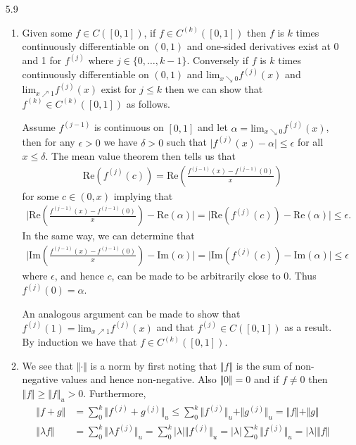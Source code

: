 \documentclass[11pt,letter]{article}
\begin{document}
\begin{enumerate}
    \item [5.9] \begin{enumerate} \item Given some $f \in C([0,1])$, if $f \in C^{(k)}([0,1])$ then $f$ is $k$ times continuously differentiable on $(0,1)$ and one-sided derivatives exist at 0 and 1 for $f^{(j)}$ where $j \in \{0,\dots,k-1\}$. Conversely if $f$ is $k$ times continuously differentiable on $(0,1)$ and $\text{lim}_{x \searrow 0} f^{(j)}(x)$ and $\text{lim}_{x \nearrow 1} f^{(j)}(x)$ exist for $j \le k$ then we can show that $f^{(k)} \in C^{(k)}([0,1])$ as follows.
    
    Assume $f^{(j-1)}$ is continuous on $[0,1]$ and let $\alpha = \text{lim}_{x \searrow 0} f^{(j)}(x)$, then for any $\epsilon > 0$ we have $\delta > 0$ such that $\vert f^{(j)}(x) - \alpha \vert \le \epsilon$ for all $x \le \delta$. The mean value theorem then tells us that
    \begin{align*}
        \text{Re}(f^{(j)}(c)) = \text{Re}(\frac{f^{(j-1)}(x) - f^{(j-1)}(0)}{x})
    \end{align*}
    for some $c \in (0,x)$ implying that
    \begin{align*}
        \vert \text{Re}(\frac{f^{(j-1)}(x) - f^{(j-1)}(0)}{x}) - \text{Re}(\alpha) \vert = \vert \text{Re}(f^{(j)}(c)) - \text{Re}(\alpha) \vert \le \epsilon.
    \end{align*}
    In the same way, we can determine that
    \begin{align*}
        \vert \text{Im}(\frac{f^{(j-1)}(x) - f^{(j-1)}(0)}{x}) - \text{Im}(\alpha) \vert = \vert \text{Im}(f^{(j)}(c)) - \text{Im}(\alpha) \vert \le \epsilon
    \end{align*}
    where $\epsilon$, and hence $c$, can be made to be arbitrarily close to 0. Thus $f^{(j)}(0) = \alpha$. 
    
    An analogous argument can be made to show that $f^{(j)}(1) = \text{lim}_{x \nearrow 1} f^{(j)}(x)$ and that $f^{(j)} \in C([0,1])$ as a result. By induction we have that $f \in C^{(k)}([0,1])$.

    \item We see that $\Vert \cdot \Vert$ is a norm by first noting that $\Vert f \Vert$ is the sum of non-negative values and hence non-negative. Also $\Vert 0 \Vert = 0$ and if $f \ne 0$ then $\Vert f \Vert \ge \Vert f \Vert_u > 0$. Furthermore,
    \begin{align*}
        \Vert f + g \Vert & = \sum_0^k \Vert f^{(j)} + g^{(j)} \Vert_u \le \sum_0^k \Vert f^{(j)} \Vert_u + \Vert g^{(j)} \Vert_u = \Vert f \Vert + \Vert g \Vert \\ 
        \Vert \lambda f \Vert & = \sum_0^k \Vert \lambda f^{(j)} \Vert_u = \sum_0^k \vert \lambda \vert \Vert f^{(j)} \Vert_u = \vert \lambda \vert \sum_0^k \Vert f^{(j)} \Vert_u = \vert \lambda \vert \Vert f \Vert
    \end{align*}


\end{enumerate}
\end{enumerate}
\end{document}
